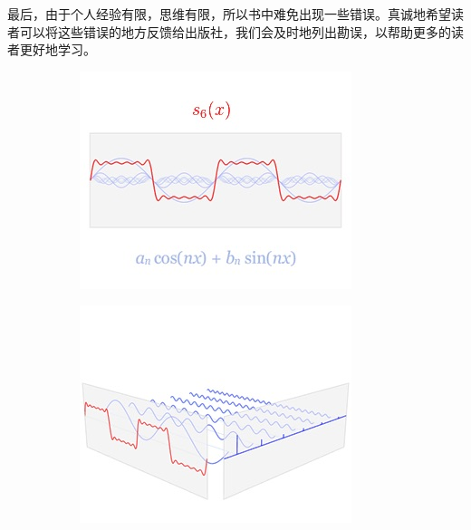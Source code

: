 最后，由于个人经验有限，思维有限，所以书中难免出现一些错误。真诚地希望读者可以将这些错误的地方反馈给出版社，我们会及时地列出勘误，以帮助更多的读者更好地学习。


\begin{figure}
\begin{fullwidth}
	\begin{subfigure}[b]{0.33\thewidth}
		\includegraphics[width=1.\textwidth]{figures/intro/fourier-1}
	\end{subfigure}
	\begin{subfigure}[b]{0.33\thewidth}
		\includegraphics[width=1.\textwidth]{figures/intro/fourier-2}

\end{subfigure}
\end{fullwidth}
\end{figure}

